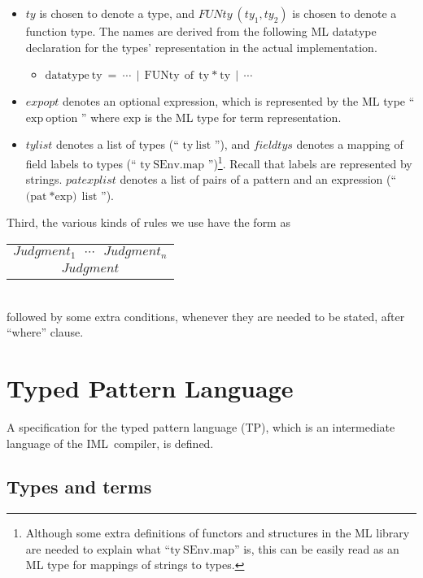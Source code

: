 \documentclass{article}
\newcommand{\sep}{\hspace*{2ex}}
\newcommand{\rulelab}{1.2cm}
\newcommand{\mklab}[1]{\sep\makebox[\rulelab][r]{{(#1)}\ }}
\newcommand{\ruleone}[3]{\mklab{#1}
                        \begin{tabular}{c}#2\\ \cline{1-1} #3
                        \end{tabular}}
\newcommand{\IML}{IML\ }
\newcommand{\ty}       {ty}
\newcommand{\tys}      {tylist}
\newcommand{\fieldtys} {fieldtys}
\newcommand{\expr}     {exp}
\newcommand{\expropt}  {expopt}
\newcommand{\pat}      {pat}
\newcommand{\patexprs} {patexplist}
\begin{document}
\begin{itemize}
\item $\ty$ is chosen to denote a type, and $FUNty \ (\ty_1, \ty_2)$
is chosen to denote a function type. The names are derived from the
following ML datatype declaration for the types' representation in the
actual implementation.
\begin{itemize}
\item 
$ \mbox{datatype} \ \mbox{\ty} \ = \ \cdots \ \ | \ \ \mbox{FUNty} \ \ \mbox{of} \ \ \mbox{\ty} \ \mbox{*} \ \mbox{\ty} \ \ | \ \ \cdots$
\end{itemize}

\item $\expropt$ denotes an optional expression, which is represented
by the ML type `` $\mbox{\expr} \ \mbox{option}$ '' where
$\mbox{\expr}$ is the ML type for term representation.

\item $\tys$ denotes a list of types (`` $\mbox{\ty} \ \mbox{list}$
''), and $\fieldtys$ denotes a mapping of field labels to types (``
$\mbox{\ty} \ \mbox{SEnv.map}$ '')\footnote{Although some extra
definitions of functors and structures in the ML library are needed to
explain what ``$\mbox{\ty} \ \mbox{SEnv.map}$'' is, this can be
easily read as an ML type for mappings of strings to types.}.  Recall that
labels are represented by strings.  $\patexprs$ denotes a list of
pairs of a pattern and an expression (`` $\mbox{(\pat} \ \mbox{*}
\mbox{\expr)} \ \ \mbox{list}$ '').

\end{itemize}

Third, the various kinds of rules we use have the form as 

\ruleone{rule}
   { $Judgment_1 \ \ \ \cdots \ \ \ Judgment_n$ }
   { $Judgment$ }
\\
followed by some extra conditions, whenever they are needed to be
stated, after ``where'' clause. 


\section{Typed Pattern Language}

A specification for the typed pattern language (TP), which is
an intermediate language of the \IML compiler, is defined.  

\subsection{Types and terms}
\end{document}
